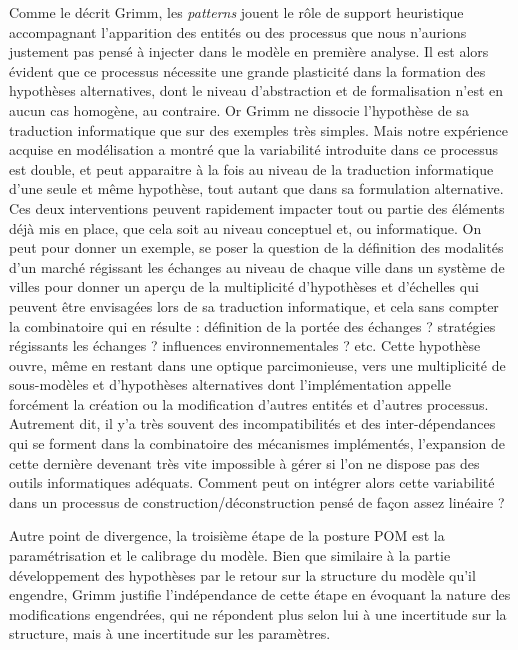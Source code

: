 Comme le décrit Grimm, les \textit{patterns} jouent le rôle de support heuristique accompagnant l'apparition des entités ou des processus que nous n'aurions justement pas pensé à injecter dans le modèle en première analyse. Il est alors évident que ce processus nécessite une grande plasticité dans la formation des hypothèses alternatives, dont le niveau d'abstraction et de formalisation n'est en aucun cas homogène, au contraire. Or Grimm ne dissocie l'hypothèse de sa traduction informatique que sur des exemples très simples. Mais notre expérience acquise en modélisation a montré que la variabilité introduite dans ce processus est double, et peut apparaitre à la fois au niveau de la traduction informatique d'une seule et même hypothèse, tout autant que dans sa formulation alternative. Ces deux interventions peuvent rapidement impacter tout ou partie des éléments déjà mis en place, que cela soit au niveau conceptuel et, ou informatique. On peut pour donner un exemple, se poser la question de la définition des modalités d'un marché régissant les échanges au niveau de chaque ville dans un système de villes pour donner un aperçu de la multiplicité d'hypothèses et d'échelles qui peuvent être envisagées lors de sa traduction informatique, et cela sans compter la combinatoire qui en résulte : définition de la portée des échanges ? stratégies régissants les échanges ? influences environnementales ? etc. Cette hypothèse ouvre, même en restant dans une optique parcimonieuse, vers une multiplicité de sous-modèles et d'hypothèses alternatives dont l'implémentation appelle forcément la création ou la modification d'autres entités et d'autres processus. Autrement dit, il y'a très souvent des incompatibilités et des inter-dépendances qui se forment dans la combinatoire des mécanismes implémentés, l'expansion de cette dernière devenant très vite impossible à gérer si l'on ne dispose pas des outils informatiques adéquats. Comment peut on intégrer alors cette variabilité dans un processus de construction/déconstruction pensé de façon assez linéaire ?

Autre point de divergence, la troisième étape de la posture POM est la paramétrisation et le calibrage du modèle. Bien que similaire à la partie développement des hypothèses par le retour sur la structure du modèle qu'il engendre, Grimm justifie l'indépendance de cette étape en évoquant la nature des modifications engendrées, qui ne répondent plus selon lui à une incertitude sur la structure, mais à une incertitude sur les paramètres. %

